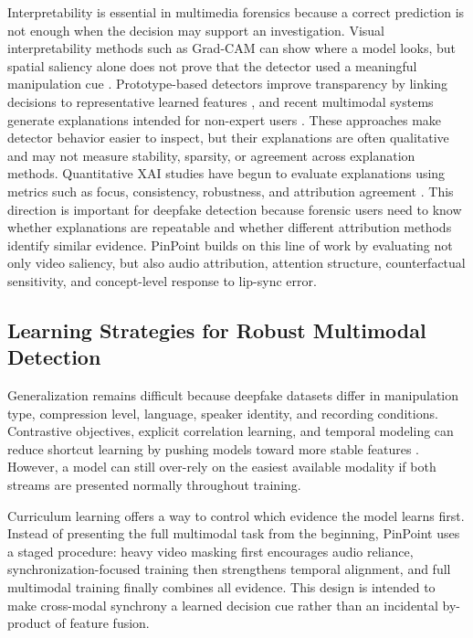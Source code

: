 \documentclass[pdflatex,sn-mathphys-num]{sn-jnl}
\begin{document}
Interpretability is essential in multimedia forensics because a correct prediction is not enough when the decision may support an investigation. Visual interpretability methods such as Grad-CAM can show where a model looks, but spatial saliency alone does not prove that the detector used a meaningful manipulation cue \cite{ref21}. Prototype-based detectors improve transparency by linking decisions to representative learned features \cite{ref18,ref24}, and recent multimodal systems generate explanations intended for non-expert users \cite{ref9,ref14}. These approaches make detector behavior easier to inspect, but their explanations are often qualitative and may not measure stability, sparsity, or agreement across explanation methods.
Quantitative XAI studies have begun to evaluate explanations using metrics such as focus, consistency, robustness, and attribution agreement \cite{ref4,ref8}. This direction is important for deepfake detection because forensic users need to know whether explanations are repeatable and whether different attribution methods identify similar evidence. PinPoint builds on this line of work by evaluating not only video saliency, but also audio attribution, attention structure, counterfactual sensitivity, and concept-level response to lip-sync error.

\subsection{Learning Strategies for Robust Multimodal Detection}\label{sec2.3}


Generalization remains difficult because deepfake datasets differ in manipulation type, compression level, language, speaker identity, and recording conditions. Contrastive objectives, explicit correlation learning, and temporal modeling can reduce shortcut learning by pushing models toward more stable features \cite{ref3,ref10,ref11}. However, a model can still over-rely on the easiest available modality if both streams are presented normally throughout training.

Curriculum learning offers a way to control which evidence the model learns first. Instead of presenting the full multimodal task from the beginning, PinPoint uses a staged procedure: heavy video masking first encourages audio reliance, synchronization-focused training then strengthens temporal alignment, and full multimodal training finally combines all evidence. This design is intended to make cross-modal synchrony a learned decision cue rather than an incidental by-product of feature fusion.
\end{document}
